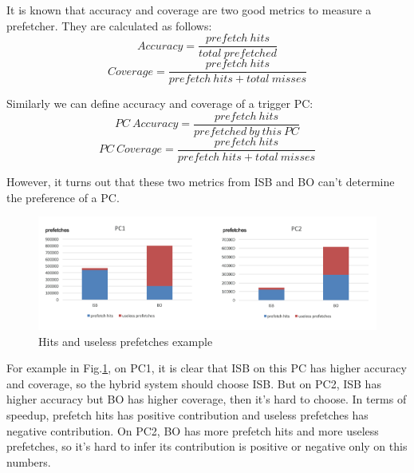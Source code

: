   It is known that accuracy and coverage are two good metrics to measure a prefetcher. They are calculated as follows:
  \begin{equation}
 Accuracy = \frac{prefetch\ hits}{total\  prefetched} 
 \end{equation}
  \begin{equation}
  Coverage = \frac{prefetch\ hits}{prefetch\ hits + total\ misses}
  \end{equation}
  
  Similarly we can define accuracy and coverage of a trigger PC:
  \begin{equation}
  PC\ Accuracy = \frac{prefetch\ hits}{prefetched\ by\ this\ PC}
  \end{equation}
  \begin{equation}
  PC\ Coverage = \frac{prefetch\ hits}{prefetch\ hits + total\ misses}
 \end{equation}
 
 However, it turns out that these two metrics from ISB and BO can't determine the preference of a PC. 
 
 \begin{figure}[ht!]
	\centering
	\includegraphics[width=1.0\textwidth]{images/metric.png}
	\caption{Hits and useless prefetches example}
	\label{fig:metric}
\end{figure}

For example in Fig.\ref{fig:metric}, on PC1, it is clear that ISB on this PC has higher accuracy and coverage, so the hybrid system should choose ISB. But on PC2, ISB has higher accuracy but BO has higher coverage, then it's hard to choose. In terms of speedup, prefetch hits has positive contribution and useless prefetches has negative contribution. On PC2, BO has more prefetch hits and more useless prefetches, so it's hard to infer its contribution is positive or negative only on this numbers. 
  
